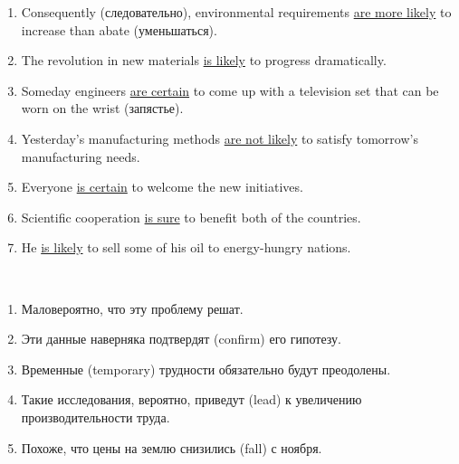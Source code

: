 \documentclass[main.tex]{subfiles}
\begin{document}

\begin{enumerate}[nosep,leftmargin=*]
	\itemsep\eitsp
	\item Consequently (следовательно), environmental requirements \uline{are more likely} to increase than abate (уменьшаться).
	\item The revolution in new materials \uline{is likely} to progress dramatically.
	\item Someday engineers \uline{are certain} to come up with a television set that can be worn on the wrist (запястье).
	\item Yesterday's manufacturing methods \uline{are not likely} to satisfy tomorrow's manufacturing needs.
	\item Everyone \uline{is certain} to welcome the new initiatives.
	\item Scientific cooperation \uline{is sure} to benefit both of the countries.
	\item He \uline{is likely} to sell some of his oil to energy-hungry nations.
\end{enumerate}
\ 


\begin{enumerate}[nosep,leftmargin=*]
	\itemsep\eitsp
	\item Маловероятно, что эту проблему решат.
	\item Эти данные наверняка подтвердят (confirm) его гипотезу.
	\item Временные (temporary) трудности обязательно будут преодолены.
	\item Такие исследования, вероятно, приведут (lead) к увеличению производительности труда.
	\item Похоже, что цены на землю снизились (fall) с ноября.
\end{enumerate}
\ 

\end{document}
